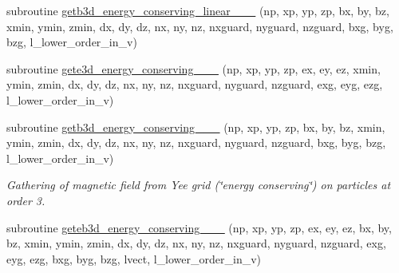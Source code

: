 \begin{DoxyCompactItemize}
\item 
subroutine \hyperlink{field__gathering__3d__o3_8_f90_af2124c863ea5023482442eca03daff98}{getb3d\+\_\+energy\+\_\+conserving\+\_\+linear\+\_\+\_\+\_} (np, xp, yp, zp, bx, by, bz, xmin, ymin, zmin,                                                                                                                                                           dx, dy, dz, nx, ny, nz, nxguard, nyguard, nzguard,                                                                                                                                                   bxg, byg, bzg, l\+\_\+lower\+\_\+order\+\_\+in\+\_\+v)
\item 
subroutine \hyperlink{field__gathering__3d__o3_8_f90_a31c9a7c694702493d3f93ec9abaab046}{gete3d\+\_\+energy\+\_\+conserving\+\_\+\_\+\_} (np, xp, yp, zp, ex, ey, ez, xmin, ymin, zmin,                                                                                                                                                                           dx, dy, dz, nx, ny, nz, nxguard, nyguard, nzguard,                                                                                                                                                   exg, eyg, ezg, l\+\_\+lower\+\_\+order\+\_\+in\+\_\+v)
\item 
subroutine \hyperlink{field__gathering__3d__o3_8_f90_a14f7dada83129910dde71b2237a3113b}{getb3d\+\_\+energy\+\_\+conserving\+\_\+\_\+\_} (np, xp, yp, zp, bx, by, bz, xmin, ymin, zmin,                                                                                                                                                                           dx, dy, dz, nx, ny, nz, nxguard, nyguard, nzguard,                                                                                                                                                   bxg, byg, bzg, l\+\_\+lower\+\_\+order\+\_\+in\+\_\+v)
\begin{DoxyCompactList}\small\item\em Gathering of magnetic field from Yee grid (\char`\"{}energy conserving\char`\"{}) on particles at order 3. \end{DoxyCompactList}\item 
subroutine \hyperlink{field__gathering__3d__o3_8_f90_aa296f91b8369f8c698d2503f0fb6beb4}{geteb3d\+\_\+energy\+\_\+conserving\+\_\+\_\+\_} (np, xp, yp, zp, ex, ey, ez, bx, by, bz,                                                                                                                                                                       xmin, ymin, zmin,                                                                                                                                                                                               dx, dy, dz, nx, ny, nz, nxguard, nyguard, nzguard,                                                                                                                                                                       exg, eyg, ezg, bxg, byg, bzg, lvect, l\+\_\+lower\+\_\+order\+\_\+in\+\_\+v)

\end{DoxyCompactItemize}
